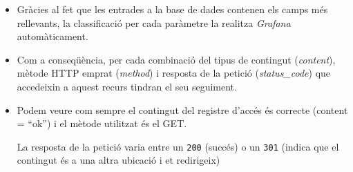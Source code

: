 \begin{itemize}
    \item Gràcies al fet que les entrades a la base de dades contenen els camps més rellevants, la classificació per cada paràmetre la realitza \textit{Grafana} automàticament.
    \item Com a conseqüència, per cada combinació del tipus de contingut (\textit{content}), mètode HTTP emprat (\textit{method}) i resposta de la petició (\textit{status\_code}) que accedeixin a aquest recurs tindran el seu seguiment.
    \item Podem veure com sempre el contingut del registre d’accés és correcte (content = “ok”) i el mètode utilitzat és el GET.

    La resposta de la petició varia entre un \texttt{200} (succés) o un \texttt{301} (indica que el contingut és a una altra ubicació i et redirigeix)
\end{itemize}



